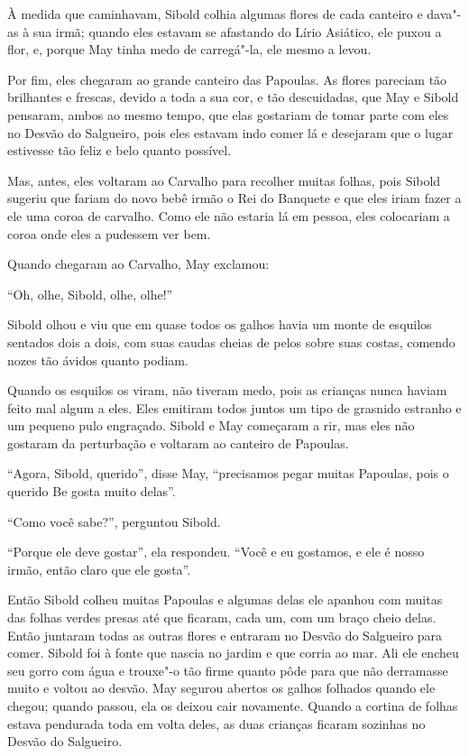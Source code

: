 À medida que caminhavam, Sibold colhia algumas flores de cada canteiro e
dava"-as à sua irmã; quando eles estavam se afastando do Lírio Asiático,
ele puxou a flor, e, porque May tinha medo de carregá"-la, ele mesmo a
levou.

Por fim, eles chegaram ao grande canteiro das Papoulas. As flores
pareciam tão brilhantes e frescas, devido a toda a sua cor, e tão
descuidadas, que May e Sibold pensaram, ambos ao mesmo tempo, que elas
gostariam de tomar parte com eles no Desvão do Salgueiro, pois eles
estavam indo comer lá e desejaram que o lugar estivesse tão feliz e belo
quanto possível.

Mas, antes, eles voltaram ao Carvalho para recolher muitas folhas, pois
Sibold sugeriu que fariam do novo bebê irmão o Rei do Banquete e que
eles iriam fazer a ele uma coroa de carvalho. Como ele não estaria lá em
pessoa, eles colocariam a coroa onde eles a pudessem ver bem.

Quando chegaram ao Carvalho, May exclamou:

``Oh, olhe, Sibold, olhe, olhe!''

Sibold olhou e viu que em quase todos os galhos havia um monte de
esquilos sentados dois a dois, com suas caudas cheias de pelos sobre
suas costas, comendo nozes tão ávidos quanto podiam.

Quando os esquilos os viram, não tiveram medo, pois as crianças nunca
haviam feito mal algum a eles. Eles emitiram todos juntos um tipo de
grasnido estranho e um pequeno pulo engraçado. Sibold e May começaram a
rir, mas eles não gostaram da perturbação e voltaram ao canteiro de
Papoulas.

``Agora, Sibold, querido'', disse May, ``precisamos pegar muitas
Papoulas, pois o querido Be gosta muito delas''.

``Como você sabe?'', perguntou Sibold.

``Porque ele deve gostar'', ela respondeu. ``Você e eu gostamos, e ele é
nosso irmão, então claro que ele gosta''.

Então Sibold colheu muitas Papoulas e algumas delas ele apanhou com
muitas das folhas verdes presas até que ficaram, cada um, com um braço
cheio delas. Então juntaram todas as outras flores e entraram no Desvão
do Salgueiro para comer. Sibold foi à fonte que nascia no jardim e que
corria ao mar. Ali ele encheu seu gorro com água e trouxe"-o tão firme
quanto pôde para que não derramasse muito e voltou ao desvão. May
segurou abertos os galhos folhados quando ele chegou; quando passou, ela
os deixou cair novamente. Quando a cortina de folhas estava pendurada
toda em volta deles, as duas crianças ficaram sozinhas no Desvão do
Salgueiro.

